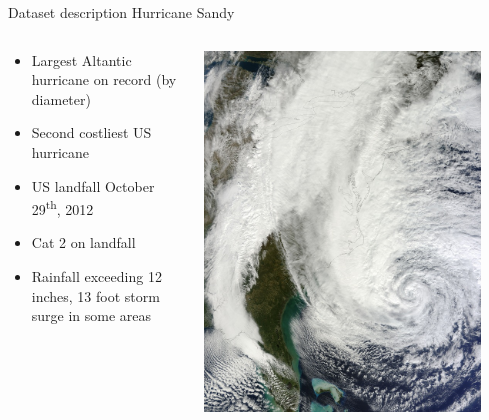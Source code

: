 \documentclass[xcolor=svgnames]{beamer}\usepackage[]{graphicx}\usepackage[]{color}
\begin{document}
\begin{frame}{Dataset description}
Hurricane Sandy
\begin{columns}
\begin{column}{0.45\textwidth}
\begin{itemize}
\item Largest Altantic hurricane on record (by  diameter)
\item Second costliest US hurricane
\item US landfall October 29\textsuperscript{th}, 2012
\item Cat 2 on landfall
\item Rainfall exceeding 12 inches, 13 foot storm surge in some areas
\end{itemize}
\end{column}
\begin{column}{0.45\textwidth}
\centerline{\includegraphics[width = 0.9\textwidth]{Sandy_Oct_28_2012.jpg}}
\end{column}
\end{columns}
\end{frame}
\end{document}
